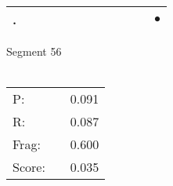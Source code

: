 \documentclass[landscape]{article}
\newcommand{\ssp}{\hspace{2pt}}
\newcommand{\mex}{\cellcolor{g}$\bullet$}
\begin{document}
\begin{tabular}{|l|p{10pt}|p{10pt}|p{10pt}|p{10pt}|p{10pt}|p{10pt}|p{10pt}|p{10pt}|p{10pt}|p{10pt}|p{10pt}|}
\hline
\ssp \cellcolor{ref10}. \ssp&\hspace{2pt}&\hspace{2pt}&\hspace{2pt}&\hspace{2pt}&\hspace{2pt}&\hspace{2pt}&\hspace{2pt}&\hspace{2pt}&\hspace{2pt}&\hspace{2pt}&\hspace{2pt}\mex\\
\hline
\end{tabular}

\vspace{6pt}
\noindent Segment 56\\\\
\noindent\begin{tabular}{lm{12pt}r}
\hline
P:&&0.091\\
R:&&0.087\\
Frag:&&0.600\\
Score:&&0.035\\
\end{tabular}

\newpage
\end{document}
